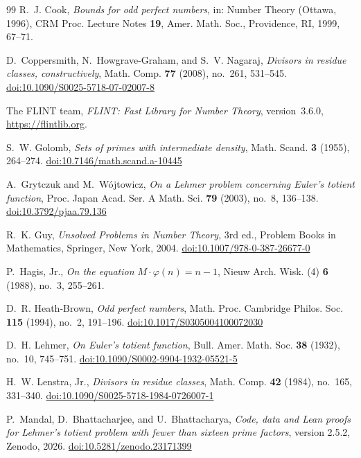 \documentclass[11pt,reqno]{amsart}
\numberwithin{equation}{section}
\theoremstyle{plain}
\theoremstyle{definition}
\theoremstyle{remark}
\begin{document}
\begin{thebibliography}{99}
R.~J. Cook,
\emph{Bounds for odd perfect numbers},
in: Number Theory (Ottawa, 1996), CRM Proc. Lecture Notes \textbf{19},
Amer. Math. Soc., Providence, RI, 1999, 67--71.

D.~Coppersmith, N.~Howgrave-Graham, and S.~V. Nagaraj,
\emph{Divisors in residue classes, constructively},
Math. Comp. \textbf{77} (2008), no.~261, 531--545.
\href{https://doi.org/10.1090/S0025-5718-07-02007-8}{doi:10.1090/S0025-5718-07-02007-8}

The FLINT team,
\emph{FLINT: Fast Library for Number Theory}, version~3.6.0,
\url{https://flintlib.org}.

S.~W. Golomb,
\emph{Sets of primes with intermediate density},
Math. Scand. \textbf{3} (1955), 264--274.
\href{https://doi.org/10.7146/math.scand.a-10445}{doi:10.7146/math.scand.a-10445}

A.~Grytczuk and M.~W\'ojtowicz,
\emph{On a Lehmer problem concerning Euler's totient function},
Proc. Japan Acad. Ser. A Math. Sci. \textbf{79} (2003), no.~8, 136--138.
\href{https://doi.org/10.3792/pjaa.79.136}{doi:10.3792/pjaa.79.136}

R.~K. Guy,
\emph{Unsolved Problems in Number Theory}, 3rd ed.,
Problem Books in Mathematics, Springer, New York, 2004.
\href{https://doi.org/10.1007/978-0-387-26677-0}{doi:10.1007/978-0-387-26677-0}

P.~Hagis, Jr.,
\emph{On the equation $M\cdot\varphi(n)=n-1$},
Nieuw Arch. Wisk. (4) \textbf{6} (1988), no.~3, 255--261.

D.~R. Heath-Brown,
\emph{Odd perfect numbers},
Math. Proc. Cambridge Philos. Soc. \textbf{115} (1994), no.~2, 191--196.
\href{https://doi.org/10.1017/S0305004100072030}{doi:10.1017/S0305004100072030}

D.~H. Lehmer,
\emph{On Euler's totient function},
Bull. Amer. Math. Soc. \textbf{38} (1932), no.~10, 745--751.
\href{https://doi.org/10.1090/S0002-9904-1932-05521-5}{doi:10.1090/S0002-9904-1932-05521-5}

H.~W. Lenstra, Jr.,
\emph{Divisors in residue classes},
Math. Comp. \textbf{42} (1984), no.~165, 331--340.
\href{https://doi.org/10.1090/S0025-5718-1984-0726007-1}{doi:10.1090/S0025-5718-1984-0726007-1}

P.~Mandal, D.~Bhattacharjee, and U.~Bhattacharya,
\emph{Code, data and Lean proofs for Lehmer's totient problem with
fewer than sixteen prime factors}, version 2.5.2, Zenodo, 2026.
\href{https://doi.org/10.5281/zenodo.23171399}{doi:10.5281/zenodo.23171399}


\end{thebibliography}
\end{document}
